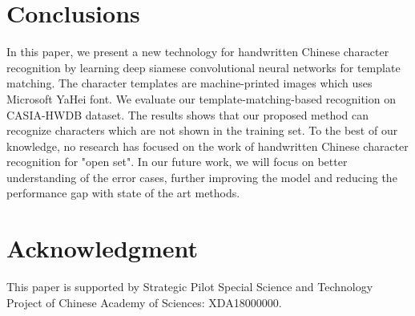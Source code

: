 \documentclass[conference]{IEEEtran}
\begin{document}




\section{Conclusions}
\label{Conclusions}
In this paper, we present a new technology for handwritten Chinese character recognition by learning deep siamese convolutional neural networks for template matching. The character templates are machine-printed images which uses Microsoft YaHei font. We evaluate our template-matching-based recognition on CASIA-HWDB dataset. The results shows that our proposed method can recognize characters which are not shown in the training set. To the best of our knowledge, no research has focused on the work of handwritten Chinese character recognition for "open set". In our future work, we will focus on better understanding of the error cases, further improving the model and reducing the performance gap with state of the art methods.






\section*{Acknowledgment}

This paper is supported by Strategic Pilot Special Science and Technology Project of Chinese Academy of Sciences: XDA18000000.





\end{document}
